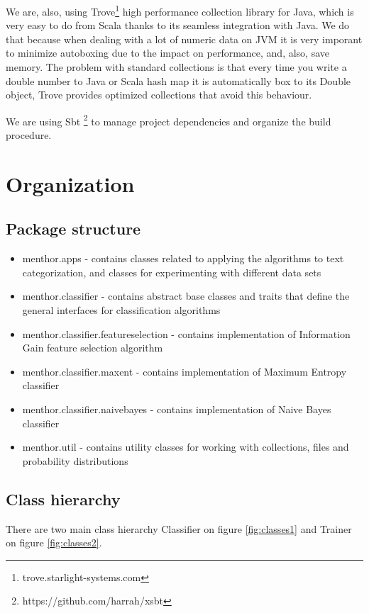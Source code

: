 \documentclass{report}
\begin{document}
We are, also, using Trove\footnote{trove.starlight-systems.com} high performance collection library for Java, which is very easy to do from Scala thanks to its seamless integration with Java. We do that because when dealing with a lot of numeric data on JVM it is very imporant to minimize autoboxing due to the impact on performance, and, also, save memory.  The problem with standard collections is that every time you write a double number to Java or Scala hash map it is automatically box to its Double object, Trove provides optimized collections that avoid this behaviour.

We are using Sbt \footnote{https://github.com/harrah/xsbt} to manage project dependencies and organize the build procedure.

\section{Organization}

\subsection{Package structure}

\begin{itemize}

\item menthor.apps - contains classes related to applying the algorithms to text categorization, and classes for experimenting with different data sets
\item menthor.classifier - contains abstract base classes and traits that define the general interfaces for classification algorithms
\item menthor.classifier.featureselection - contains implementation of Information Gain feature selection algorithm
\item menthor.classifier.maxent - contains implementation of Maximum Entropy classifier
\item menthor.classifier.naivebayes - contains implementation of Naive Bayes classifier
\item menthor.util - contains utility classes for working with collections, files and probability distributions
\end{itemize}

\subsection{Class hierarchy}

There are two main class hierarchy Classifier on figure \ref{fig:classes1} and Trainer on figure \ref{fig:classes2}.
 
\end{document}
